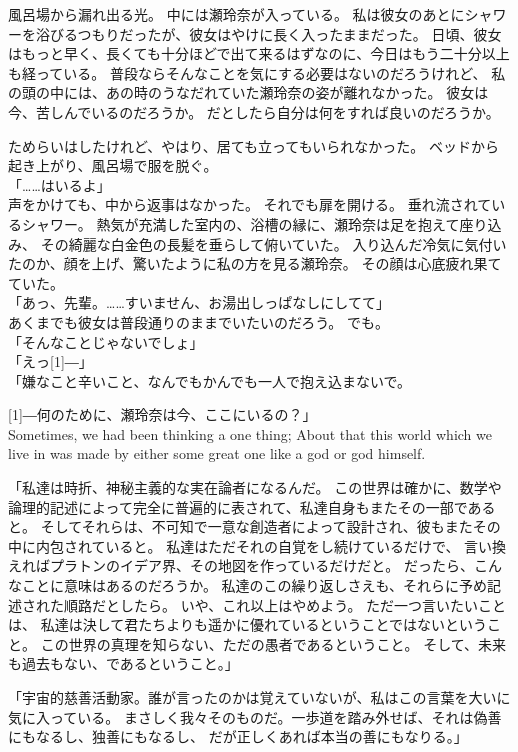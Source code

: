 \documentclass[autodetect-engine,dvipdfmx-if-dvi,a5paper,ja=standard,twoside,titlepage,final,twocolumn]{ltjtbook}
\begin{document}
風呂場から漏れ出る光。
中には瀬玲奈が入っている。
私は彼女のあとにシャワーを浴びるつもりだったが、彼女はやけに長く入ったままだった。
日頃、彼女はもっと早く、長くても十分ほどで出て来るはずなのに、今日はもう二十分以上も経っている。
普段ならそんなことを気にする必要はないのだろうけれど、
私の頭の中には、あの時のうなだれていた瀬玲奈の姿が離れなかった。
彼女は今、苦しんでいるのだろうか。
だとしたら自分は何をすれば良いのだろうか。

ためらいはしたけれど、やはり、居ても立ってもいられなかった。
ベッドから起き上がり、風呂場で服を脱ぐ。\\
「……はいるよ」\\
声をかけても、中から返事はなかった。
それでも扉を開ける。
垂れ流されているシャワー。
熱気が充満した室内の、浴槽の縁に、瀬玲奈は足を抱えて座り込み、
その綺麗な白金色の長髪を垂らして俯いていた。
入り込んだ冷気に気付いたのか、顔を上げ、驚いたように私の方を見る瀬玲奈。
その顔は心底疲れ果てていた。\\
「あっ、先輩。……すいません、お湯出しっぱなしにしてて」\\
あくまでも彼女は普段通りのままでいたいのだろう。
でも。\\
「そんなことじゃないでしょ」\\
「えっ\scalebox{3}[1]{―}」\\
「嫌なこと辛いこと、なんでもかんでも一人で抱え込まないで。

\scalebox{3}[1]{―}何のために、瀬玲奈は今、ここにいるの？」\\

Sometimes, we had been thinking a one thing; 
About that this world which we live in 
was made by either some great one like a god or god himself.

「私達は時折、神秘主義的な実在論者になるんだ。
この世界は確かに、数学や論理的記述によって完全に普遍的に表されて、私達自身もまたその一部であると。
そしてそれらは、不可知で一意な創造者によって設計され、彼もまたその中に内包されていると。
私達はただそれの自覚をし続けているだけで、
言い換えればプラトンのイデア界、その地図を作っているだけだと。
だったら、こんなことに意味はあるのだろうか。
私達のこの繰り返しさえも、それらに予め記述された順路だとしたら。
いや、これ以上はやめよう。
ただ一つ言いたいことは、
私達は決して君たちよりも遥かに優れているということではないということ。
この世界の真理を知らない、ただの愚者であるということ。
そして、未来も過去もない、であるということ。」

「宇宙的慈善活動家。誰が言ったのかは覚えていないが、私はこの言葉を大いに気に入っている。
まさしく我々そのものだ。一歩道を踏み外せば、それは偽善にもなるし、独善にもなるし、
だが正しくあれば本当の善にもなりる。」
\end{document}
